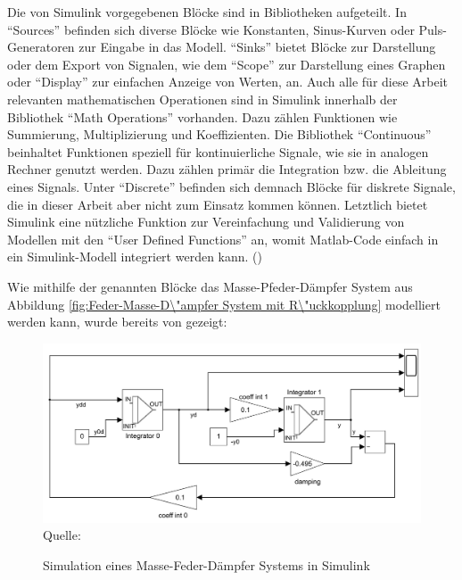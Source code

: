 Die von Simulink vorgegebenen Blöcke sind in Bibliotheken aufgeteilt. In "`Sources"' befinden sich diverse Blöcke wie Konstanten, Sinus-Kurven oder Puls-Generatoren zur Eingabe in das Modell. "`Sinks"' bietet Blöcke zur Darstellung oder dem Export von Signalen, wie dem "`Scope"' zur Darstellung eines Graphen oder "`Display"' zur einfachen Anzeige von Werten, an. Auch alle für diese Arbeit relevanten mathematischen Operationen sind in Simulink innerhalb der Bibliothek "`Math Operations"' vorhanden. Dazu zählen Funktionen wie Summierung, Multiplizierung und Koeffizienten. Die Bibliothek "`Continuous"' beinhaltet Funktionen speziell für kontinuierliche Signale, wie sie in analogen Rechner genutzt werden. Dazu zählen primär die Integration bzw. die Ableitung eines Signals. Unter "`Discrete"' befinden sich demnach Blöcke für diskrete Signale, die in dieser Arbeit aber nicht zum Einsatz kommen können. Letztlich bietet Simulink eine nützliche Funktion zur Vereinfachung und Validierung von Modellen mit den "`User Defined Functions"' an, womit Matlab-Code einfach in ein Simulink-Modell integriert werden kann. (\cite[vgl.]{Peasley2018})

Wie mithilfe der genannten Blöcke das Masse-Pfeder-Dämpfer System aus Abbildung \ref{fig:Feder-Masse-D\"ampfer System mit R\"uckkopplung} modelliert werden kann, wurde bereits von \citeauthor{Ulmann2022} gezeigt:

\begin{figure}[h]
  \caption{Simulation eines Masse-Feder-Dämpfer Systems in Simulink}
  \includegraphics[width=\textwidth]{abbildungen/simulink_beispiel.png}
  \\
  Quelle: \cite[S. 241]{Ulmann2022}
  \label{fig:Masse-Feder-Dämpfer Simulink}
\end{figure}

